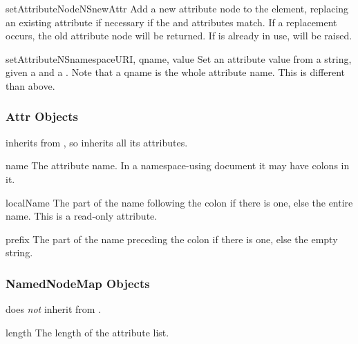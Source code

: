\begin{methoddesc}[Element]{setAttributeNodeNS}{newAttr}
Add a new attribute node to the element, replacing an existing
attribute if necessary if the  and
 attributes match.  If a replacement occurs, the old
attribute node will be returned.  If  is already in use,
 will be raised.
\end{methoddesc}

\begin{methoddesc}[Element]{setAttributeNS}{namespaceURI, qname, value}
Set an attribute value from a string, given a  and a
.  Note that a qname is the whole attribute name.  This is
different than above.
\end{methoddesc}


\subsubsection{Attr Objects \label{dom-attr-objects}}

 inherits from , so inherits all its
attributes.

\begin{memberdesc}[Attr]{name}
The attribute name.  In a namespace-using document it may have colons
in it.
\end{memberdesc}

\begin{memberdesc}[Attr]{localName}
The part of the name following the colon if there is one, else the
entire name.  This is a read-only attribute.
\end{memberdesc}

\begin{memberdesc}[Attr]{prefix}
The part of the name preceding the colon if there is one, else the
empty string.
\end{memberdesc}


\subsubsection{NamedNodeMap Objects \label{dom-attributelist-objects}}

 does \emph{not} inherit from .

\begin{memberdesc}[NamedNodeMap]{length}
The length of the attribute list.
\end{memberdesc}

